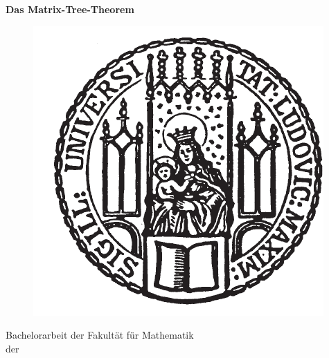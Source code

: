 \documentclass[11pt,a4paper,twoside]{article}
\begin{document}
\lhead[\fancyplain{}{\thepage}]{\fancyplain{}{\rightmark}}
\rhead[\fancyplain{}{\leftmark}]{\fancyplain{}{\thepage}}
\cfoot{}
\begin{titlepage}
\begin{center}
\vspace*{0.65cm}
\huge{}
\setcounter{page}{1}
\hspace*{-0.73cm}
\textbf{Das Matrix-Tree-Theorem}\\
\vspace*{2.2cm}

\begin{figure}[h]
	\begin{center}
		\hspace*{-0.73cm}
		\includegraphics{lmu_siegel}
	\end{center}
\end{figure}
\vspace*{0.5cm}
\Large
\hspace*{-0.73cm}
\hspace*{-0.5cm}Bachelorarbeit der Fakultät für Mathematik\\
\vspace*{0.1cm}
\hspace*{-0.73cm}
\hspace*{-0.5cm}der\\
\vspace*{0.1cm}

\end{center}
\end{titlepage}
\end{document}
